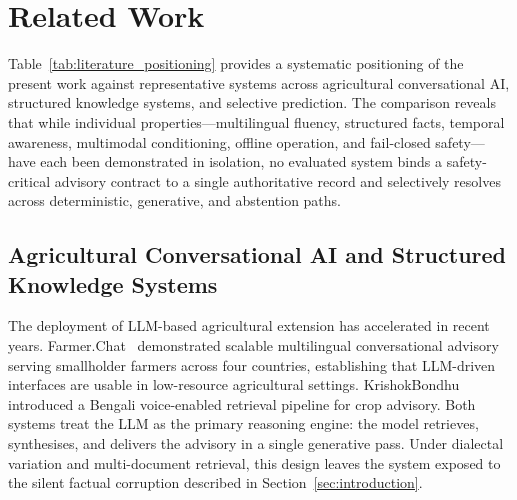 \section{Related Work}
\label{sec:related_work}

Table~\ref{tab:literature_positioning} provides a systematic positioning of the present work against representative systems across agricultural conversational AI, structured knowledge systems, and selective prediction. The comparison reveals that while individual properties---multilingual fluency, structured facts, temporal awareness, multimodal conditioning, offline operation, and fail-closed safety---have each been demonstrated in isolation, no evaluated system binds a safety-critical advisory contract to a single authoritative record and selectively resolves across deterministic, generative, and abstention paths.



\subsection{Agricultural Conversational AI and Structured Knowledge Systems}
The deployment of LLM-based agricultural extension has accelerated in recent years. Farmer.Chat~\citep{farmerchat2024} demonstrated scalable multilingual conversational advisory serving smallholder farmers across four countries, establishing that LLM-driven interfaces are usable in low-resource agricultural settings. KrishokBondhu~\citep{krishokbondhu2025} introduced a Bengali voice-enabled retrieval pipeline for crop advisory. Both systems treat the LLM as the primary reasoning engine: the model retrieves, synthesises, and delivers the advisory in a single generative pass. Under dialectal variation and multi-document retrieval, this design leaves the system exposed to the silent factual corruption described in Section~\ref{sec:introduction}.

